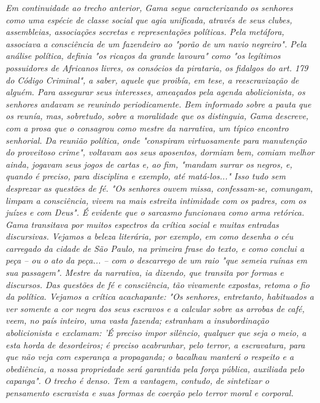 \emph{Em continuidade ao trecho anterior, Gama segue caracterizando os
senhores como uma espécie de classe social que agia unificada, através
de seus clubes, assembleias, associações secretas e representações
políticas. Pela metáfora, associava a consciência de um fazendeiro ao
"porão de um navio negreiro". Pela análise política, definia "os ricaços
da grande lavoura" como "os legítimos possuidores de Africanos livres,
os consócios da pirataria, os fidalgos do art. 179 do Código Criminal",
a saber, aquele que proibía, em tese, a reescravização de alguém. Para
assegurar seus interesses, ameaçados pela agenda abolicionista, os
senhores andavam se reunindo periodicamente. Bem informado sobre a pauta
que os reunía, mas, sobretudo, sobre a moralidade que os distinguia,
Gama descreve, com a prosa que o consagrou como mestre da narrativa, um
típico encontro senhorial. Da reunião política, onde "conspiram
virtuosamente para manutenção do proveitoso crime", voltavam aos seus
aposentos, dormiam bem, comiam melhor ainda, jogavam seus jogos de
cartas e, ao fim, "mandam surrar os negros, e, quando é preciso, para
disciplina e exemplo, até matá-los..." Isso tudo sem desprezar as
questões de fé. "Os senhores ouvem missa, confessam-se, comungam, limpam
a consciência, vivem na mais estreita intimidade com os padres, com os
juízes e com Deus". É evidente que o sarcasmo funcionava como arma
retórica. Gama transitava por muitos espectros da crítica social e
muitas entradas discursivas. Vejamos a beleza literária, por exemplo, em
como desenha o céu carregado da cidade de São Paulo, na primeira frase
do texto, e como conclui a peça -- ou o ato da peça... -- com o
descarrego de um raio "que semeia ruínas em sua passagem". Mestre da
narrativa, ia dizendo, que transita por formas e discursos. Das questões
de fé e consciência, tão vivamente expostas, retoma o fio da política.
Vejamos a crítica acachapante: "Os senhores, entretanto, habituados a
ver somente a cor negra dos seus escravos e a calcular sobre as arrobas
de café, veem, no país inteiro, uma vasta fazenda; estranham a
insubordinação abolicionista e exclamam: 'É preciso impor silêncio,
qualquer que seja o meio, a esta horda de desordeiros; é preciso
acabrunhar, pelo terror, a escravatura, para que não veja com esperança
a propaganda; o bacalhau manterá o respeito e a obediência, a nossa
propriedade será garantida pela força pública, auxiliada pelo capanga".
O trecho é denso. Tem a vantagem, contudo, de sintetizar o pensamento
escravista e suas formas de coerção pelo terror moral e corporal. }

